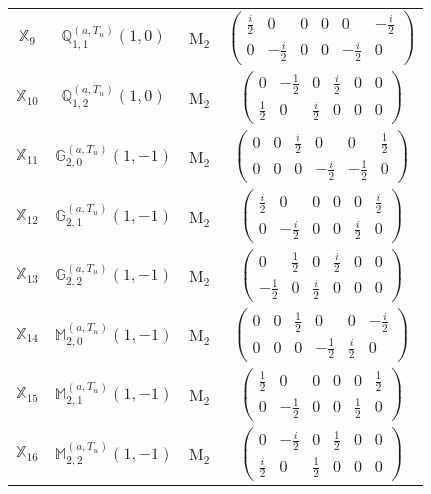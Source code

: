 \documentclass[fleqn,10pt,landscape]{article}
\begin{document}
\begin{itemize}
\begin{center}
\begin{longtable}{c|c|c|c}
$ \mathbb{X}_{9} $ & $\mathbb{Q}_{1,1}^{(a,T_{u})}(1,0)$ & M$_{2}$ & $\begin{pmatrix} \frac{i}{2} & 0 & 0 & 0 & 0 & - \frac{i}{2} \\ 0 & - \frac{i}{2} & 0 & 0 & - \frac{i}{2} & 0 \end{pmatrix}$ \\
$ \mathbb{X}_{10} $ & $\mathbb{Q}_{1,2}^{(a,T_{u})}(1,0)$ & M$_{2}$ & $\begin{pmatrix} 0 & - \frac{1}{2} & 0 & \frac{i}{2} & 0 & 0 \\ \frac{1}{2} & 0 & \frac{i}{2} & 0 & 0 & 0 \end{pmatrix}$ \\
$ \mathbb{X}_{11} $ & $\mathbb{G}_{2,0}^{(a,T_{u})}(1,-1)$ & M$_{2}$ & $\begin{pmatrix} 0 & 0 & \frac{i}{2} & 0 & 0 & \frac{1}{2} \\ 0 & 0 & 0 & - \frac{i}{2} & - \frac{1}{2} & 0 \end{pmatrix}$ \\
$ \mathbb{X}_{12} $ & $\mathbb{G}_{2,1}^{(a,T_{u})}(1,-1)$ & M$_{2}$ & $\begin{pmatrix} \frac{i}{2} & 0 & 0 & 0 & 0 & \frac{i}{2} \\ 0 & - \frac{i}{2} & 0 & 0 & \frac{i}{2} & 0 \end{pmatrix}$ \\
$ \mathbb{X}_{13} $ & $\mathbb{G}_{2,2}^{(a,T_{u})}(1,-1)$ & M$_{2}$ & $\begin{pmatrix} 0 & \frac{1}{2} & 0 & \frac{i}{2} & 0 & 0 \\ - \frac{1}{2} & 0 & \frac{i}{2} & 0 & 0 & 0 \end{pmatrix}$ \\
$ \mathbb{X}_{14} $ & $\mathbb{M}_{2,0}^{(a,T_{u})}(1,-1)$ & M$_{2}$ & $\begin{pmatrix} 0 & 0 & \frac{1}{2} & 0 & 0 & - \frac{i}{2} \\ 0 & 0 & 0 & - \frac{1}{2} & \frac{i}{2} & 0 \end{pmatrix}$ \\
$ \mathbb{X}_{15} $ & $\mathbb{M}_{2,1}^{(a,T_{u})}(1,-1)$ & M$_{2}$ & $\begin{pmatrix} \frac{1}{2} & 0 & 0 & 0 & 0 & \frac{1}{2} \\ 0 & - \frac{1}{2} & 0 & 0 & \frac{1}{2} & 0 \end{pmatrix}$ \\
$ \mathbb{X}_{16} $ & $\mathbb{M}_{2,2}^{(a,T_{u})}(1,-1)$ & M$_{2}$ & $\begin{pmatrix} 0 & - \frac{i}{2} & 0 & \frac{1}{2} & 0 & 0 \\ \frac{i}{2} & 0 & \frac{1}{2} & 0 & 0 & 0 \end{pmatrix}$ \\

\end{longtable}
\end{center}
\end{itemize}
\end{document}
